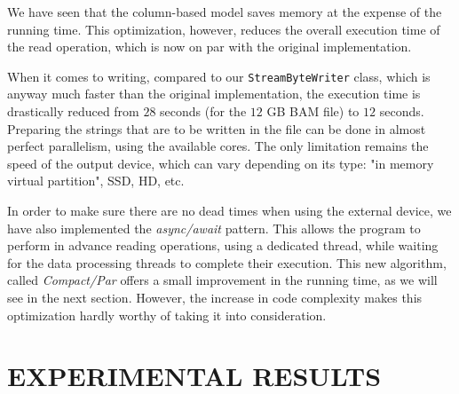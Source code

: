 \documentclass[a4paper,twoside]{article}
\begin{document}
We have seen that the column-based model saves memory at the expense of the running time.
This optimization, however, reduces the overall execution time of the read operation, which is now on par with the original implementation.

When it comes to writing, compared to our {\texttt{StreamByteWriter} } class, which is anyway much faster than the original implementation, the execution time is drastically reduced from $28$ seconds (for the $12$ GB BAM file) to $12$ seconds.
Preparing the strings that are to be written in the file can be done in almost perfect parallelism, using the available cores.
The only limitation remains the speed of the output device, which can vary depending on its type: "in memory virtual partition", SSD, HD, etc.
	
In order to make sure there are no dead times when using the external device, 
we have also implemented the {\textit{async/await} } pattern.
This allows the program to perform in advance reading operations, using a dedicated thread, while waiting for the data processing threads to complete their execution.
This new algorithm, called {\textit{Compact/Par} } offers a small improvement in the running time, as we will see in the next section.
However, the increase in code complexity makes this optimization hardly worthy of taking it into consideration.






\section{\uppercase{Experimental Results}}\label{sec:uppercase2}
\end{document}
